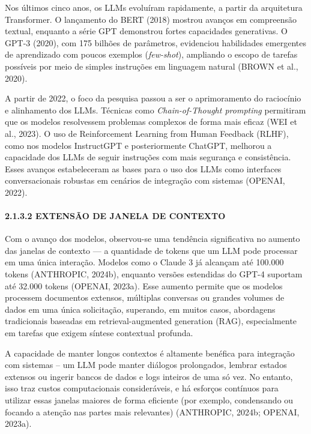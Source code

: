 \documentclass[
]{article}
\begin{document}
Nos últimos cinco anos, os LLMs evoluíram rapidamente, a partir da
arquitetura Transformer. O lançamento do BERT (2018) mostrou avanços em
compreensão textual, enquanto a série GPT demonstrou fortes capacidades
generativas. O GPT-3 (2020), com 175 bilhões de parâmetros, evidenciou
habilidades emergentes de aprendizado com poucos exemplos
(\emph{few-shot}), ampliando o escopo de tarefas possíveis por meio de
simples instruções em linguagem natural (BROWN et al., 2020).

A partir de 2022, o foco da pesquisa passou a ser o aprimoramento do
raciocínio e alinhamento dos LLMs. Técnicas como \emph{Chain-of-Thought
prompting} permitiram que os modelos resolvessem problemas complexos de
forma mais eficaz (WEI et al., 2023). O uso de Reinforcement Learning
from Human Feedback (RLHF), como nos modelos InstructGPT e
posteriormente ChatGPT, melhorou a capacidade dos LLMs de seguir
instruções com mais segurança e consistência. Esses avanços
estabeleceram as bases para o uso dos LLMs como interfaces
conversacionais robustas em cenários de integração com sistemas (OPENAI,
2022).

\paragraph{2.1.3.2 EXTENSÃO DE JANELA DE
CONTEXTO}\label{extensuxe3o-de-janela-de-contexto}

Com o avanço dos modelos, observou-se uma tendência significativa no
aumento das janelas de contexto --- a quantidade de tokens que um LLM
pode processar em uma única interação. Modelos como o Claude 3 já
alcançam até 100.000 tokens (ANTHROPIC, 2024b), enquanto versões
estendidas do GPT-4 suportam até 32.000 tokens (OPENAI, 2023a). Esse
aumento permite que os modelos processem documentos extensos, múltiplas
conversas ou grandes volumes de dados em uma única solicitação,
superando, em muitos casos, abordagens tradicionais baseadas em
retrieval-augmented generation (RAG), especialmente em tarefas que
exigem síntese contextual profunda.

A capacidade de manter longos contextos é altamente benéfica para
integração com sistemas -- um LLM pode manter diálogos prolongados,
lembrar estados extensos ou ingerir bancos de dados e logs inteiros de
uma só vez. No entanto, isso traz custos computacionais consideráveis, e
há esforços contínuos para utilizar essas janelas maiores de forma
eficiente (por exemplo, condensando ou focando a atenção nas partes mais
relevantes) (ANTHROPIC, 2024b; OPENAI, 2023a).
\end{document}
